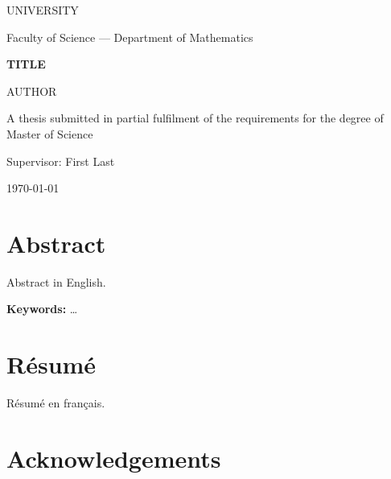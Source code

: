\documentclass[12pt,oneside]{report}
\theoremstyle{plain}
\theoremstyle{definition}
\theoremstyle{remark}
\begin{document}
\begin{titlepage}
  \centering
  {\large UNIVERSITY\par}
  {\large Faculty of Science — Department of Mathematics\par}
  \vspace{3cm}
  {\LARGE\bfseries {{TITLE}}\par}
  \vspace{2cm}
  {\Large {{AUTHOR}}\par}
  \vspace{1.5cm}
  A thesis submitted in partial fulfilment of the requirements for the degree of Master of Science\par
  \vfill
  {\large Supervisor: First Last\par}
  \vspace{1cm}
  {\large \today\par}
\end{titlepage}

\chapter*{Abstract}
Abstract in English.

\textbf{Keywords:} \dots

\chapter*{Résumé}
\begin{otherlanguage}{french}Résumé en français.\end{otherlanguage}

\chapter*{Acknowledgements}

\tableofcontents
\listoffigures

\cleardoublepage
{}





\appendix




\end{document}

